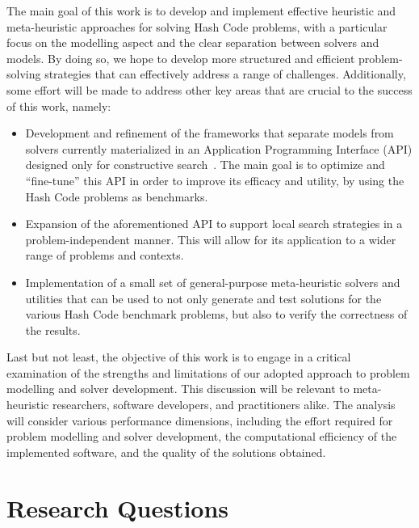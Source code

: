 The main goal of this work is to develop and implement effective heuristic and
meta-heuristic approaches for solving Hash Code problems, with a particular
focus on the modelling aspect and the clear separation between solvers and
models. By doing so, we hope to develop more structured and efficient
problem-solving strategies that can effectively address a range of challenges.
Additionally, some effort will be made to address other key areas that are
crucial to the success of this work, namely:

\begin{itemize}
      \item Development and refinement of the frameworks that separate models from solvers
            currently materialized in an Application Programming Interface (API)
            designed only for constructive search~\cite{outeiro2021application}.
            The main goal is to optimize and ``fine-tune'' this API in order to improve its
            efficacy and utility, by using the Hash Code problems as benchmarks.

      \item Expansion of the aforementioned API to support local search strategies
            in a problem-independent manner. This will allow for its application to a wider
            range of problems and contexts.

      \item Implementation of a small set of general-purpose meta-heuristic solvers and utilities
            that can be used to not only generate and test solutions for the various
            Hash Code benchmark problems, but also to verify the correctness of the results.
\end{itemize}

Last but not least, the objective of this work is to engage in a critical
examination of the strengths and limitations of our adopted approach to problem
modelling and solver development. This discussion will be relevant to
meta-heuristic researchers, software developers, and practitioners alike. The
analysis will consider various performance dimensions, including the effort
required for problem modelling and solver development, the computational
efficiency of the implemented software, and the quality of the solutions
obtained.

\section{Research Questions}
\label{section:research-questions}


